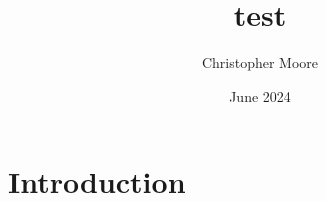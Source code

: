 \documentclass{article}
\title{test}
\author{Christopher Moore}
\date{June 2024}
\begin{document}
\maketitle

\section{Introduction}
\end{document}
